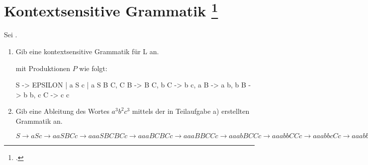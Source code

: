\documentclass{lehramt-informatik-aufgabe}
\begin{document}
\section{Kontextsensitive Grammatik
\footcite{theo:ab:3}}

Sei .

\begin{enumerate}


\item Gib eine kontextsensitive Grammatik für L an.

\begin{liAntwort}
 mit
Produktionen $P$ wie folgt:

\begin{liProduktionsRegeln}
S -> EPSILON | a S c | a S B C,
C B -> B C,
b C -> b c,
a B -> a b,
b B -> b b,
c C -> c c
\end{liProduktionsRegeln}
\end{liAntwort}


\item Gib eine Ableitung des Wortes $a^3 b^2 c^3$ mittels der in
Teilaufgabe a) erstellten Grammatik an.

\begin{liAntwort}
$S
\rightarrow aSc
\rightarrow aaSBCc
\rightarrow aaaSBCBCc
\rightarrow aaaBCBCc
\rightarrow aaaBBCCc
\rightarrow aaabBCCc
\rightarrow aaabbCCc
\rightarrow aaabbcCc
\rightarrow aaabbccc
$
\end{liAntwort}
\end{enumerate}
\end{document}
